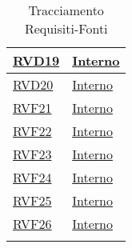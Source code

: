 \begin{longtable}{|>{\centering}m{5cm}|m{5cm}<{\centering}|}
\hyperlink{RVD19}{RVD19} & \hyperlink{Interno}{Interno}\\ \hline

\hyperlink{RVD20}{RVD20} & \hyperlink{Interno}{Interno}\\ \hline

\hyperlink{RVF21}{RVF21} & \hyperlink{Interno}{Interno}\\ \hline

\hyperlink{RVF22}{RVF22} & \hyperlink{Interno}{Interno}\\ \hline

\hyperlink{RVF23}{RVF23} & \hyperlink{Interno}{Interno}\\ \hline

\hyperlink{RVF24}{RVF24} & \hyperlink{Interno}{Interno}\\ \hline

\hyperlink{RVF25}{RVF25} & \hyperlink{Interno}{Interno}\\ \hline

\hyperlink{RVF26}{RVF26} & \hyperlink{Interno}{Interno}\\ \hline

\caption[Tracciamento Requisiti-Fonti]{Tracciamento Requisiti-Fonti}
\label{tabella:requi-fonti}
\end{longtable}
\clearpage
